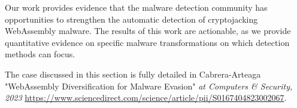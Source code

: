 Our work provides evidence that the malware detection community has opportunities to strengthen the automatic detection of cryptojacking WebAssembly malware. 
The results of this work are actionable, as we provide quantitative evidence on specific malware transformations on which detection methods can focus.


\begin{tcolorbox}[title=Contribution paper,boxrule=1pt,arc=.2em,boxsep=1.0mm]
    The case discussed in this section is fully detailed in Cabrera-Arteaga \etal "WebAssembly Diversification for Malware Evasion"
    \emph{at Computers \& Security, 2023}
    \url{https://www.sciencedirect.com/science/article/pii/S0167404823002067}. 
\end{tcolorbox}
